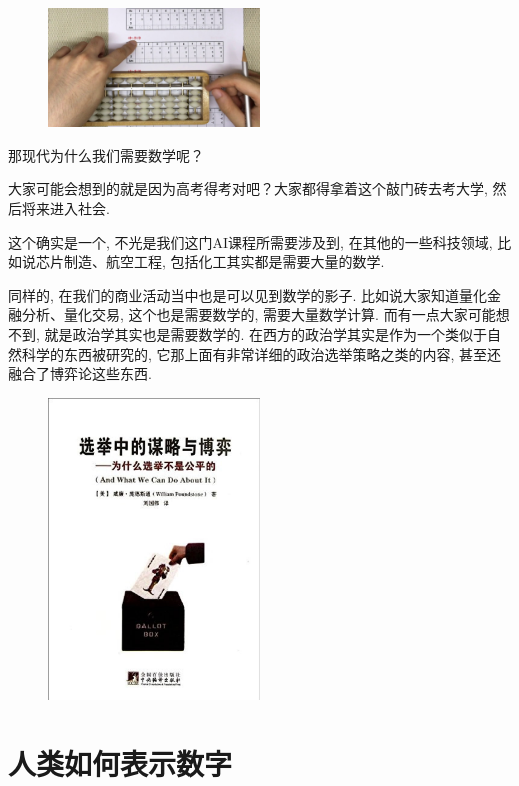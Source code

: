 \begin{figure}[ht]
  \centering
  \includegraphics[width=0.5\textwidth]{asset/1c84c0f7-5335-4252-88ac-5e08192d89c3.png}
  \caption{}
  \label{fig:img2_1}
\end{figure}

那现代为什么我们需要数学呢？

大家可能会想到的就是因为高考得考对吧？大家都得拿着这个敲门砖去考大学, 然后将来进入社会. 

这个确实是一个, 不光是我们这门AI课程所需要涉及到, 在其他的一些科技领域, 比如说芯片制造、航空工程, 包括化工其实都是需要大量的数学. 

同样的, 在我们的商业活动当中也是可以见到数学的影子. 比如说大家知道量化金融分析、量化交易, 这个也是需要数学的, 需要大量数学计算. 而有一点大家可能想不到, 就是政治学其实也是需要数学的. 在西方的政治学其实是作为一个类似于自然科学的东西被研究的, 它那上面有非常详细的政治选举策略之类的内容, 甚至还融合了博弈论这些东西. 

\begin{figure}[ht]
  \centering
  \includegraphics[width=0.5\textwidth]{asset/7e4f1c0f-936f-4b29-82e1-5294232218f3.png}
  \caption{}
  \label{fig:img2_2}
\end{figure}

\section{人类如何表示数字}

